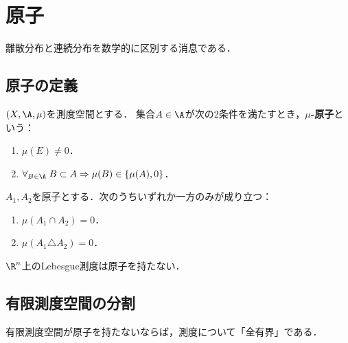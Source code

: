 \documentclass[uplatex,dvipdfmx]{jsreport}
\begin{document}
\section{原子}

\begin{tcolorbox}[colframe=ForestGreen, colback=ForestGreen!10!white,breakable,colbacktitle=ForestGreen!40!white,coltitle=black,fonttitle=\bfseries\sffamily,
title=]
    離散分布と連続分布を数学的に区別する消息である．
\end{tcolorbox}

\subsection{原子の定義}

\begin{definition}[atom]
    $(X,\A,\mu)$を測度空間とする．
    集合$A\in\A$が次の2条件を満たすとき，\textbf{$\mu$-原子}という：
    \begin{enumerate}
        \item $\mu(E)\ne0$．
        \item $\forall_{B\in\A}\;B\subset A\Rightarrow\mu(B)\in\{\mu(A),0\}$．
    \end{enumerate}
\end{definition}

\begin{lemma}
    $A_1,A_2$を原子とする．次のうちいずれか一方のみが成り立つ：
    \begin{enumerate}
        \item $\mu(A_1\cap A_2)=0$．
        \item $\mu(A_1\triangle A_2)=0$．
    \end{enumerate}
\end{lemma}

\begin{example}
    $\R^n$上のLebesgue測度は原子を持たない．
\end{example}

\subsection{有限測度空間の分割}

\begin{tcolorbox}[colframe=ForestGreen, colback=ForestGreen!10!white,breakable,colbacktitle=ForestGreen!40!white,coltitle=black,fonttitle=\bfseries\sffamily,
title=]
    有限測度空間が原子を持たないならば，測度について「全有界」である．
\end{tcolorbox}
\end{document}
